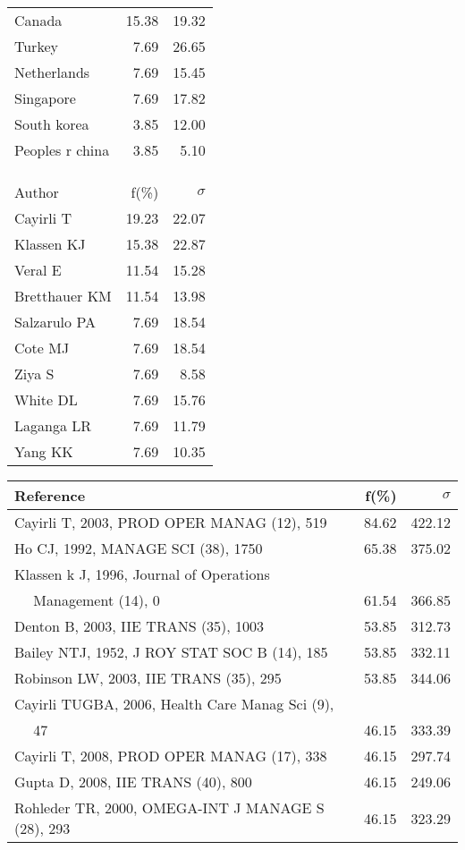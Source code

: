 \documentclass[a4paper,11pt]{report}
\begin{document}
\begin{landscape}
\begin{table}[!ht]
{\begin{tabular}{|l r r|}
Canada & 15.38 & 19.32\\
Turkey & 7.69 & 26.65\\
Netherlands & 7.69 & 15.45\\
Singapore & 7.69 & 17.82\\
South korea & 3.85 & 12.00\\
Peoples r china & 3.85 & 5.10\\
 &  & \\
 &  & \\
 &  & \\
\hline
\hline
Author & f(\%) & $\sigma$\\
\hline
Cayirli T & 19.23 & 22.07\\
Klassen KJ & 15.38 & 22.87\\
Veral E & 11.54 & 15.28\\
Bretthauer KM & 11.54 & 13.98\\
Salzarulo PA & 7.69 & 18.54\\
Cote MJ & 7.69 & 18.54\\
Ziya S & 7.69 & 8.58\\
White DL & 7.69 & 15.76\\
Laganga LR & 7.69 & 11.79\\
Yang KK & 7.69 & 10.35\\
\hline
\end{tabular}
}
{\scriptsize\begin{tabular}{|l r r|}
\hline
Reference & f(\%) & $\sigma$\\
\hline
Cayirli T, 2003, PROD OPER MANAG (12), 519 & 84.62 & 422.12\\
Ho CJ, 1992, MANAGE SCI (38), 1750 & 65.38 & 375.02\\
Klassen k J, 1996, Journal of Operations &  & \\
$\quad$ Management (14), 0 & 61.54 & 366.85\\
Denton B, 2003, IIE TRANS (35), 1003 & 53.85 & 312.73\\
Bailey NTJ, 1952, J ROY STAT SOC B (14), 185 & 53.85 & 332.11\\
Robinson LW, 2003, IIE TRANS (35), 295 & 53.85 & 344.06\\
Cayirli TUGBA, 2006, Health Care Manag Sci (9), &  & \\
$\quad$ 47 & 46.15 & 333.39\\
Cayirli T, 2008, PROD OPER MANAG (17), 338 & 46.15 & 297.74\\
Gupta D, 2008, IIE TRANS (40), 800 & 46.15 & 249.06\\
Rohleder TR, 2000, OMEGA-INT J MANAGE S (28), 293 & 46.15 & 323.29\\

\end{tabular}}
\end{table}
\end{landscape}
\end{document}
